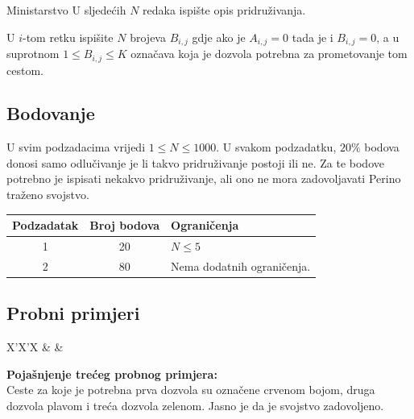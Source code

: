 \begin{statement}[
  problempoints=100,
  timelimit=1 sekunda,
  memorylimit=1024 MiB,
]{Ministarstvo}
U sljedećih $N$ redaka ispište opis pridruživanja.

U $i$-tom retku ispišite $N$ brojeva $B_{i, j}$ gdje ako je $A_{i, j} = 0$ tada je i $B_{i, j} = 0$, a u suprotnom $1 \leq B_{i, j} \leq K$ označava koja je dozvola potrebna za prometovanje tom cestom. 

\subsection*{Bodovanje}

U svim podzadacima vrijedi $1 \leq N \leq 1000$. U svakom podzadatku, $20\%$ bodova donosi samo odlučivanje je li takvo pridruživanje postoji ili ne. Za te bodove potrebno je ispisati nekakvo pridruživanje, ali ono ne mora zadovoljavati Perino traženo svojstvo. 

{\renewcommand{\arraystretch}{1.4}
  \setlength{\tabcolsep}{6pt}
  \begin{tabular}{ccl}
   Podzadatak & Broj bodova & Ograničenja \\ \midrule
    1 & 20 & $N \leq 5$  \\
    2 & 80 & Nema dodatnih ograničenja. \\
\end{tabular}}

\subsection*{Probni primjeri}
\begin{tabularx}{\textwidth}{X'X'X}
 &
 &
\end{tabularx}

\textbf{Pojašnjenje trećeg probnog primjera:}\\

Ceste za koje je potrebna prva dozvola su označene crvenom bojom, druga dozvola plavom i treća dozvola zelenom. Jasno je da je svojstvo zadovoljeno.


\end{statement}
